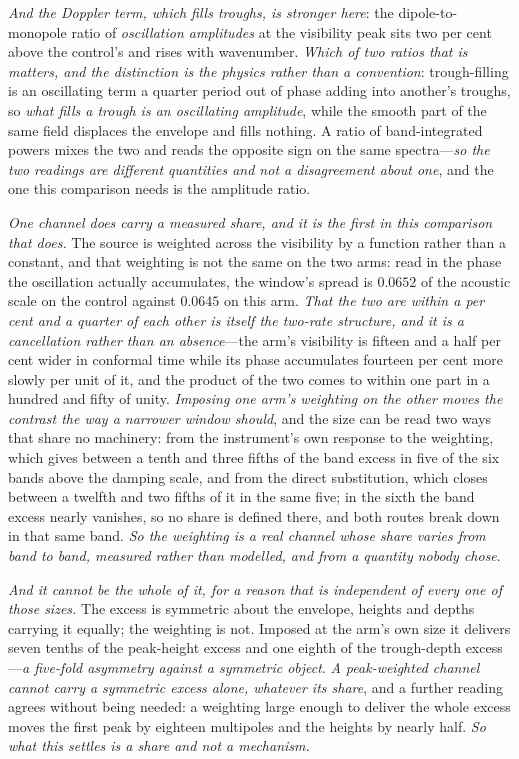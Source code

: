 \documentclass[11pt,a4paper]{article}
\theoremstyle{plain}
\theoremstyle{definition}
\theoremstyle{remark}
\begin{document}
\emph{And the Doppler term, which fills troughs, is stronger here}: the dipole-to-monopole ratio of
\emph{oscillation amplitudes} at the visibility peak sits two per cent above the control's and rises with
wavenumber. \emph{Which of two ratios that is matters, and the distinction is the physics rather than a
convention}: trough-filling is an oscillating term a quarter period out of phase adding into another's
troughs, so \emph{what fills a trough is an oscillating amplitude}, while the smooth part of the same field
displaces the envelope and fills nothing. A ratio of band-integrated powers mixes the two and reads the
opposite sign on the same spectra---\emph{so the two readings are different quantities and not a disagreement
about one}, and the one this comparison needs is the amplitude ratio.

\emph{One channel does carry a measured share, and it is the first in this comparison that does.} The
source is weighted across the visibility by a function rather than a constant, and that weighting is
not the same on the two arms: read in the phase the oscillation actually accumulates, the window's
spread is $0.0652$ of the acoustic scale on the control against $0.0645$ on this arm. \emph{That the two
are within a per cent and a quarter of each other is itself the two-rate structure, and it is a
cancellation rather than an absence}---the arm's visibility is fifteen and a half per cent wider in conformal
time while its phase accumulates fourteen per cent more slowly per unit of it, and the product of the
two comes to within one part in a hundred and fifty of unity. \emph{Imposing one arm's weighting on the other moves
the contrast the way a narrower window should}, and the size can be read two ways that share no
machinery: from the instrument's own response to the weighting, which gives between a tenth and three fifths
of the band excess in five of the six bands above the damping scale, and from the direct substitution, which closes
between a twelfth and two fifths of it in the same five; in the sixth the band excess nearly vanishes, so no share is defined there, and both routes break down in that same band. \emph{So the weighting is a real channel whose share varies from band to band,
measured rather than modelled, and from a quantity nobody chose}.

\emph{And it cannot be the whole of it, for a reason that is independent of every one of those sizes.}
The excess is symmetric about the envelope, heights and depths carrying it equally; the weighting is
not. Imposed at the arm's own size it delivers seven tenths of the peak-height excess and one eighth of
the trough-depth excess---\emph{a five-fold asymmetry against a symmetric
object}.
\emph{A peak-weighted channel cannot carry a symmetric excess alone, whatever its share}, and a
further reading agrees without being needed: a weighting large
enough to deliver the whole excess moves the first peak by eighteen multipoles and the heights by nearly
half. \emph{So what this settles is a share and not a mechanism.}
\end{document}
